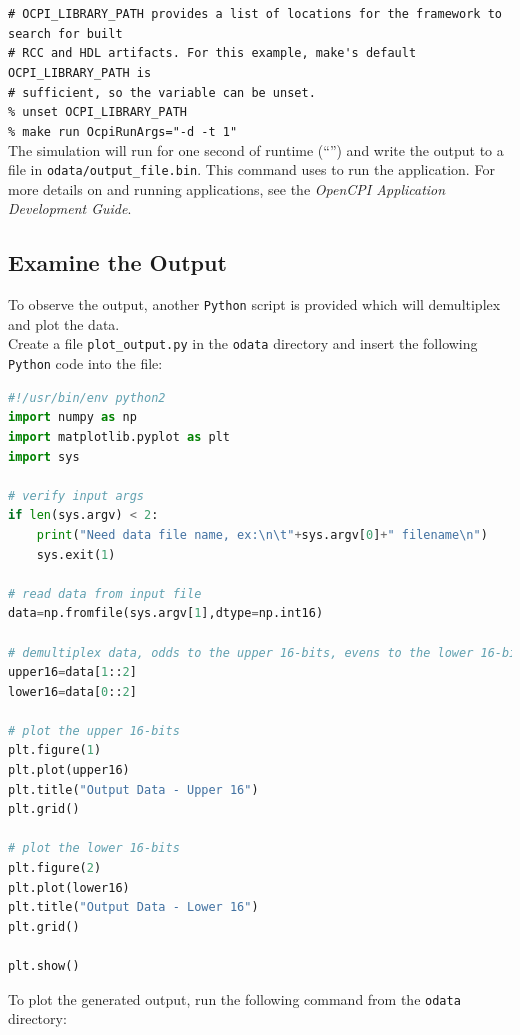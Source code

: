\forceindent\verb+# OCPI_LIBRARY_PATH provides a list of locations for the framework to search for built+\\
\forceindent\verb+# RCC and HDL artifacts. For this example, make's default OCPI_LIBRARY_PATH is+\\
\forceindent\verb+# sufficient, so the variable can be unset.+\\
\forceindent\verb+% unset OCPI_LIBRARY_PATH+   \\
\forceindent\verb+% make run OcpiRunArgs="-d -t 1"+\\
\bend
The simulation will run for one second of runtime (``'') and write the output to a file in \verb+odata/output_file.bin+.
This  command uses  to run the application. For more details on  and running applications, see the \textit{OpenCPI Application Development Guide}.

\subsection{Examine the Output}
\label{example:output}
To observe the output, another \verb+Python+ script is provided which will demultiplex and plot the data.\\
\bstart
Create a file \verb+plot_output.py+ in the \verb+odata+ directory and insert the following \verb+Python+ code into the file:
\begin{lstlisting}[language=python]
#!/usr/bin/env python2
import numpy as np
import matplotlib.pyplot as plt
import sys

# verify input args
if len(sys.argv) < 2:
    print("Need data file name, ex:\n\t"+sys.argv[0]+" filename\n")
    sys.exit(1)

# read data from input file
data=np.fromfile(sys.argv[1],dtype=np.int16)

# demultiplex data, odds to the upper 16-bits, evens to the lower 16-bits
upper16=data[1::2]
lower16=data[0::2]

# plot the upper 16-bits
plt.figure(1)
plt.plot(upper16)
plt.title("Output Data - Upper 16")
plt.grid()

# plot the lower 16-bits
plt.figure(2)
plt.plot(lower16)
plt.title("Output Data - Lower 16")
plt.grid()

plt.show()
\end{lstlisting}
\bend
\bstart
To plot the generated output, run the following command from the \verb+odata+ directory:\\

